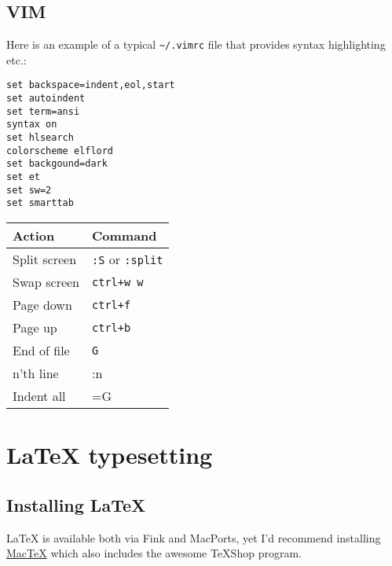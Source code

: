 \documentclass[a4paper,10pt]{article}
\begin{document}
\subsection{VIM}
Here is an example of a typical \verb"~/.vimrc" file that provides syntax highlighting etc.:
\begin{footnotesize}\begin{verbatim}
set backspace=indent,eol,start
set autoindent
set term=ansi
syntax on
set hlsearch
colorscheme elflord
set backgound=dark
set et
set sw=2
set smarttab
\end{verbatim}\end{footnotesize}
\begin{table}[h]
\begin{small}
\begin{tabular}{ll}\hline\hline
Action         & Command \\\hline
Split screen   & \verb":S" or \verb":split"\\
Swap screen    & \verb"ctrl+w w"\\
Page down      & \verb"ctrl+f"\\
Page up        & \verb"ctrl+b"\\
End of file    & \verb"G"\\
n'th line      & :n\\
Indent all     & =G\\
\hline
\end{tabular}\end{small}\end{table}

\section{\LaTeX{} typesetting}
\subsection{Installing \LaTeX{}}
\LaTeX{} is available both via Fink and MacPorts, yet I'd recommend installing \href{http://www.tug.org/mactex}{MacTeX} which also includes the awesome TeXShop program.
\end{document}
